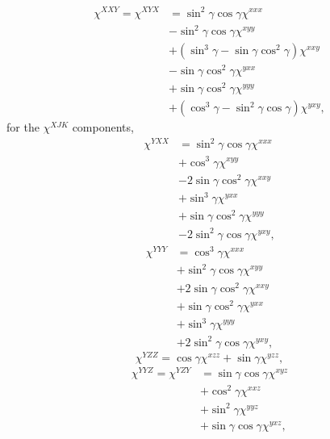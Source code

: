 \documentclass[aps,pra,10pt,amsmath,twocolumn,letterpaper]{revtex4-1}
\begin{document}
\begin{equation*}
\begin{split}
\chi^{XXY} = \chi^{XYX} 
&= \sin^{2}\gamma \cos\gamma                    \chi^{xxx}\\
&- \sin^{2}\gamma \cos\gamma                    \chi^{xyy}\\
&+ (\sin^{3}\gamma - \sin\gamma \cos^{2}\gamma) \chi^{xxy}\\
&- \sin\gamma \cos^{2}\gamma                    \chi^{yxx}\\
&+ \sin\gamma \cos^{2}\gamma                    \chi^{yyy}\\
&+ (\cos^{3}\gamma - \sin^{2}\gamma \cos\gamma) \chi^{yxy},
\end{split}
\end{equation*}
for the $\chi^{XJK}$ components,
\begin{equation*}
\begin{split}
\chi^{YXX}
&=  \sin^{2}\gamma \cos\gamma \chi^{xxx}\\
&+  \cos^{3}\gamma            \chi^{xyy}\\
&- 2\sin\gamma \cos^{2}\gamma \chi^{xxy}\\
&+  \sin^{3}\gamma            \chi^{yxx}\\
&+  \sin\gamma \cos^{2}\gamma \chi^{yyy}\\
&- 2\sin^{2}\gamma \cos\gamma \chi^{yxy},
\end{split}
\end{equation*}
\begin{equation*}
\begin{split}
\chi^{YYY}
&=  \cos^{3}\gamma            \chi^{xxx}\\
&+  \sin^{2}\gamma \cos\gamma \chi^{xyy}\\
&+ 2\sin\gamma \cos^{2}\gamma \chi^{xxy}\\
&+  \sin\gamma \cos^{2}\gamma \chi^{yxx}\\
&+  \sin^{3}\gamma            \chi^{yyy}\\
&+ 2\sin^{2}\gamma \cos\gamma \chi^{yxy},
\end{split}
\end{equation*}
\begin{equation*}
\chi^{YZZ} = \cos\gamma \chi^{xzz} + \sin\gamma \chi^{yzz},
\end{equation*}
\begin{equation*}
\begin{split}
\chi^{YYZ} = \chi^{YZY}
&= \sin\gamma \cos\gamma \chi^{xyz}\\
&+ \cos^{2}\gamma        \chi^{xxz}\\
&+ \sin^{2}\gamma        \chi^{yyz}\\
&+ \sin\gamma \cos\gamma \chi^{yxz},
\end{split}
\end{equation*}
\end{document}
